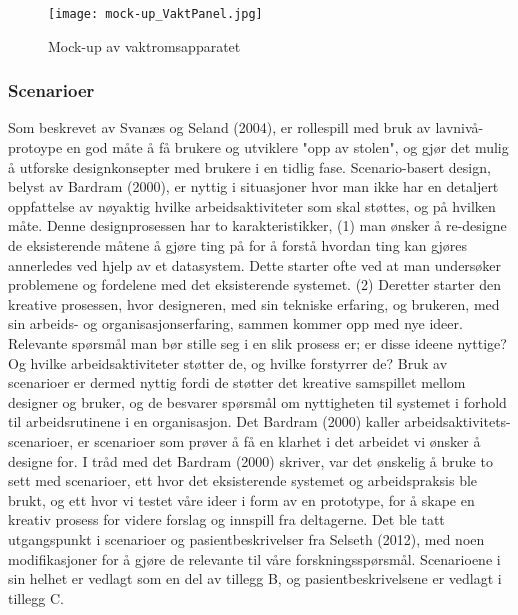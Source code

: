 \begin{figure}[H]
\centering
\texttt{[image: mock-up\_VaktPanel.jpg]}
\caption{Mock-up av vaktromsapparatet}
\label{mock-up_VaktPanel}
\end{figure}

\subsubsection{Scenarioer}
Som beskrevet av Svanæs og Seland (2004), er rollespill med bruk av lavnivå-protoype en god måte å få brukere og utviklere "opp av stolen", og gjør det mulig å utforske designkonsepter med brukere i en tidlig fase. Scenario-basert design, belyst av Bardram (2000), er nyttig i situasjoner hvor man ikke har en detaljert oppfattelse av nøyaktig hvilke arbeidsaktiviteter som skal støttes, og på hvilken måte. Denne designprosessen har to karakteristikker, (1) man ønsker å re-designe de eksisterende måtene å gjøre ting på for å forstå hvordan ting kan gjøres annerledes ved hjelp av et datasystem. Dette starter ofte ved at man undersøker problemene og fordelene med det eksisterende systemet. (2) Deretter starter den kreative prosessen, hvor designeren, med sin tekniske erfaring, og brukeren, med sin arbeids- og organisasjonserfaring, sammen kommer opp med nye ideer. Relevante spørsmål man bør stille seg i en slik prosess er; er disse ideene nyttige? Og hvilke arbeidsaktiviteter støtter de, og hvilke forstyrrer de? Bruk av scenarioer er dermed nyttig fordi de støtter det kreative samspillet mellom designer og bruker, og de besvarer spørsmål om nyttigheten til systemet i forhold til arbeidsrutinene i en organisasjon. Det Bardram (2000)\nocite{Bardram00} kaller arbeidsaktivitets-scenarioer, er scenarioer som prøver å få en klarhet i det arbeidet vi ønsker å designe for. 
I tråd med det Bardram (2000) skriver, var det ønskelig å bruke to sett med scenarioer, ett hvor det eksisterende systemet og arbeidspraksis ble brukt, og ett hvor vi testet våre ideer i form av en prototype, for å skape en kreativ prosess for videre forslag og innspill fra deltagerne. Det ble tatt utgangspunkt i scenarioer og pasientbeskrivelser fra Selseth (2012)\nocite{Selseth12}, med noen modifikasjoner for å gjøre de relevante til våre forskningsspørsmål. Scenarioene i sin helhet er vedlagt som en del av tillegg B, og pasientbeskrivelsene er vedlagt i tillegg C.

